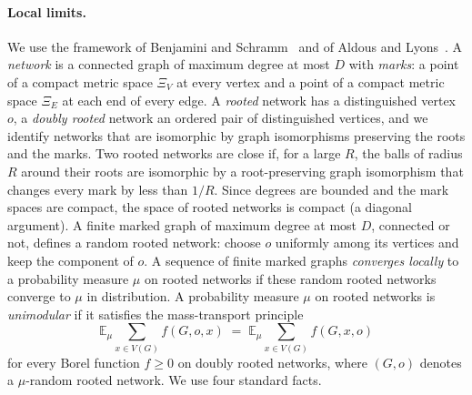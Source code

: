 \paragraph{Local limits.} We use the framework of Benjamini and Schramm~\cite{BenjaminiSchramm2001} and of Aldous and
Lyons~\cite{AldousLyons2007}. A \emph{network} is a connected graph of maximum degree at most $D$ with \emph{marks}: a
point of a compact metric space $\Xi_V$ at every vertex and a point of a compact metric space $\Xi_E$ at each end of
every edge. A \emph{rooted} network has a distinguished vertex $o$, a \emph{doubly rooted} network an ordered pair of
distinguished vertices, and we identify networks that are isomorphic by graph isomorphisms preserving the roots and the
marks. Two rooted networks are close if, for a large $R$, the balls of radius $R$ around their roots are isomorphic by a
root-preserving graph isomorphism that changes every mark by less than $1/R$. Since degrees are bounded and the mark
spaces are compact, the space of rooted networks is compact (a diagonal argument). A finite marked graph of maximum
degree at most $D$, connected or not, defines a random rooted network: choose $o$ uniformly among its vertices and keep
the component of $o$. A sequence of finite marked graphs \emph{converges locally} to a probability measure $\mu$ on
rooted networks if these random rooted networks converge to $\mu$ in distribution. A probability measure $\mu$ on
rooted networks is \emph{unimodular} if it satisfies the mass-transport principle
\begin{equation}\label{eq:ana-mtp}
  \mathbb{E}_\mu\sum_{x\in V(G)}f(G,o,x)\;=\;\mathbb{E}_\mu\sum_{x\in V(G)}f(G,x,o)
\end{equation}
for every Borel function $f\ge0$ on doubly rooted networks, where $(G,o)$ denotes a $\mu$-random rooted network. We use
four standard facts.
